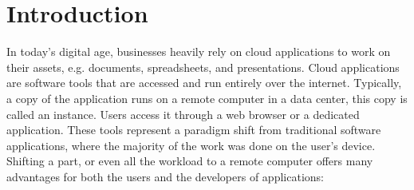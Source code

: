 \chapter{Introduction}
\label{cha:introduction}




In today's digital age, businesses heavily rely on cloud applications
to work on their assets, e.g. documents, spreadsheets, and presentations.
Cloud applications are software tools that are accessed and run entirely over the internet.
Typically, a copy of the application runs on a remote computer in a data center, this copy is called an instance.
Users access it through a web browser or a dedicated application.
These tools represent a paradigm shift from traditional software applications,
where the majority of the work was done on the user's device.
Shifting a part, or even all the workload to a remote computer offers many advantages
for both the users and the developers of applications:

\vspace{-1em} %

